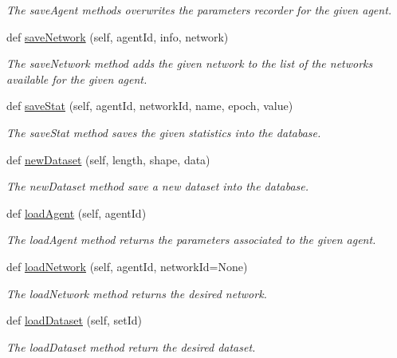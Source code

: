 \begin{DoxyCompactItemize}
\begin{DoxyCompactList}\small\item\em The save\+Agent methods overwrites the parameters recorder for the given agent. \end{DoxyCompactList}\item 
def \hyperlink{classDQN-Deepmind-NIPS-2013_1_1Saver_1_1Saver_aebf1fa14b77298919410191ecbab6fe5}{save\+Network} (self, agent\+Id, info, network)
\begin{DoxyCompactList}\small\item\em The save\+Network method adds the given network to the list of the networks available for the given agent. \end{DoxyCompactList}\item 
def \hyperlink{classDQN-Deepmind-NIPS-2013_1_1Saver_1_1Saver_ae1370bef68104eb715e1387d69bb7cf1}{save\+Stat} (self, agent\+Id, network\+Id, name, epoch, value)
\begin{DoxyCompactList}\small\item\em The save\+Stat method saves the given statistics into the database. \end{DoxyCompactList}\item 
def \hyperlink{classDQN-Deepmind-NIPS-2013_1_1Saver_1_1Saver_a5c4872622dfd891849a22e447ec7d902}{new\+Dataset} (self, length, shape, data)
\begin{DoxyCompactList}\small\item\em The new\+Dataset method save a new dataset into the database. \end{DoxyCompactList}\item 
def \hyperlink{classDQN-Deepmind-NIPS-2013_1_1Saver_1_1Saver_aaf903c7b667b1909a17beb60c13f2398}{load\+Agent} (self, agent\+Id)
\begin{DoxyCompactList}\small\item\em The load\+Agent method returns the parameters associated to the given agent. \end{DoxyCompactList}\item 
def \hyperlink{classDQN-Deepmind-NIPS-2013_1_1Saver_1_1Saver_a90f2e74db8a2b69b94959945ffb896f6}{load\+Network} (self, agent\+Id, network\+Id=None)
\begin{DoxyCompactList}\small\item\em The load\+Network method returns the desired network. \end{DoxyCompactList}\item 
def \hyperlink{classDQN-Deepmind-NIPS-2013_1_1Saver_1_1Saver_a76d60329698faf415c4ed0dae362f53e}{load\+Dataset} (self, set\+Id)
\begin{DoxyCompactList}\small\item\em The load\+Dataset method return the desired dataset. \end{DoxyCompactList}\end{DoxyCompactItemize}
